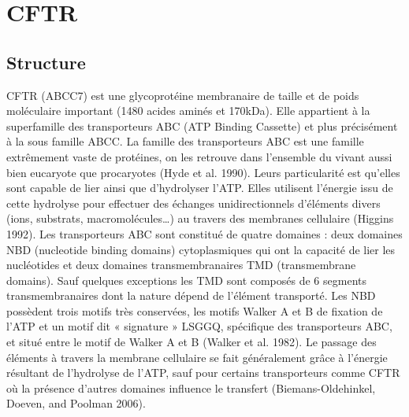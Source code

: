 
\chapter{CFTR} %


\label{ch:02-04} %


\section{Structure}
CFTR (ABCC7) est une glycoprotéine membranaire de taille et de poids moléculaire important  (1480 acides aminés et 170kDa). Elle appartient à la superfamille des transporteurs ABC (ATP Binding Cassette) et plus précisément à la sous famille ABCC.
La famille des transporteurs ABC est une famille extrêmement vaste de protéines, on les retrouve dans l’ensemble du vivant aussi bien eucaryote que procaryotes (Hyde et al. 1990)\cite{hyde_structural_1990}. Leurs particularité est qu’elles sont capable de lier ainsi que d’hydrolyser l’ATP. Elles utilisent l’énergie issu de cette hydrolyse pour effectuer des échanges unidirectionnels d’éléments divers (ions, substrats, macromolécules…) au travers des membranes cellulaire (Higgins 1992)\cite{higgins_abc_1992}. Les transporteurs ABC sont constitué de quatre domaines : deux domaines NBD (nucleotide binding domains) cytoplasmiques qui ont la capacité de lier les nucléotides et deux domaines transmembranaires TMD (transmembrane domains). Sauf quelques exceptions les TMD sont composés de 6 segments transmembranaires dont la nature dépend de l’élément transporté. Les NBD possèdent trois motifs très conservées, les motifs Walker A et B de fixation de l’ATP et un motif dit « signature » LSGGQ, spécifique des transporteurs ABC, et situé entre le motif de Walker A et B (Walker et al. 1982)\cite{walker_distantly_1982}. Le passage des éléments à travers la membrane cellulaire se fait généralement grâce à l’énergie résultant de l’hydrolyse de l’ATP, sauf pour certains transporteurs comme CFTR où la présence d’autres domaines influence le transfert (Biemans-Oldehinkel, Doeven, and Poolman 2006)\cite{biemans-oldehinkel_abc_2006}.
